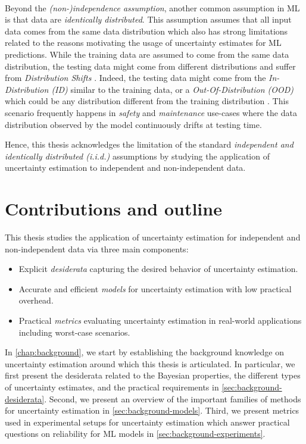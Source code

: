 \paragraph*{} Beyond the \emph{(non-)independence assumption}, another common assumption in ML is that data are \emph{identically distributed}. 
This assumption assumes that all input data comes from the same data distribution which also has strong limitations related to the reasons motivating the usage of uncertainty estimates for ML predictions.
While the training data are assumed to come from the same data distribution, the testing data might come from different distributions and suffer from \emph{Distribution Shifts} \cite{rabanser2019shift, dataset-shift}. 
Indeed, the testing data might come from the \emph{In-Distribution (ID)} similar to the training data, or a \emph{Out-Of-Distribution (OOD)} which could be any distribution different from the training distribution \cite{ood-detection-survey, ood-generalization-survey}.
This scenario frequently happens in \emph{safety} and \emph{maintenance} use-cases where the data distribution observed by the model continuously drifts at testing time. 

Hence, this thesis acknowledges the limitation of the standard \emph{independent and identically distributed (i.i.d.)} assumptions by studying the application of uncertainty estimation to independent and non-independent data.

\section{Contributions and outline}

This thesis studies the application of uncertainty estimation for independent and non-independent data via three main components:
\begin{itemize}
    \item Explicit \emph{desiderata} capturing the desired behavior of uncertainty estimation.
    \item Accurate and efficient \emph{models} for uncertainty estimation with low practical overhead.
    \item Practical \emph{metrics} evaluating uncertainty estimation in real-world applications including worst-case scenarios.
\end{itemize} 

In \cref{chap:background}, we start by establishing the background knowledge on uncertainty estimation around which this thesis is articulated. In particular, we first present the desiderata related to the Bayesian properties, the different types of uncertainty estimates, and the practical requirements in \cref{sec:background-desiderata}. Second, we present an overview of the important families of methods for uncertainty estimation in \cref{sec:background-models}. Third, we present metrics used in experimental setups for uncertainty estimation which answer practical questions on reliability for ML models in \cref{sec:background-experiments}. 

